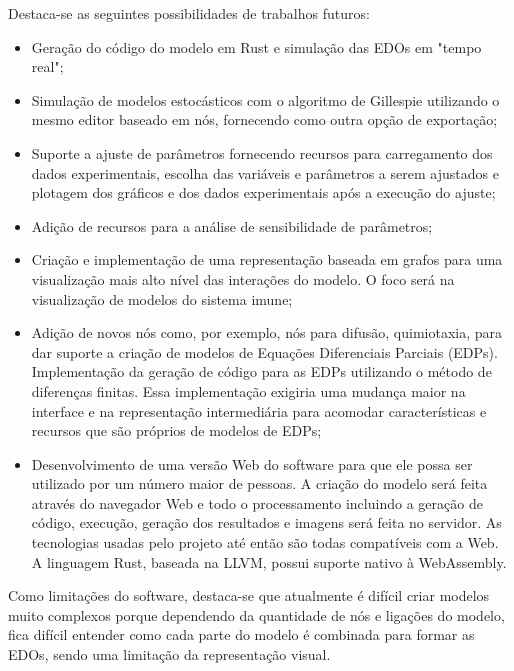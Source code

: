 \documentclass[
	12pt,				%
	openright,			%
	oneside,			%
	a4paper,			%
	main=brazil,
	english,			%
	]{ufsj-abntex2}
\begin{document}
Destaca-se as seguintes possibilidades de trabalhos futuros: 
\begin{itemize}
    \item Geração do código do modelo em Rust e simulação das EDOs em "tempo real";
    \item Simulação de modelos estocásticos com o algoritmo de Gillespie utilizando o mesmo editor baseado em nós, fornecendo como outra opção de exportação; 
    \item Suporte a ajuste de parâmetros fornecendo recursos para carregamento dos dados experimentais, escolha das variáveis e parâmetros a serem ajustados e plotagem dos gráficos e dos dados experimentais após a execução do ajuste; 
    \item Adição de recursos para a análise de sensibilidade de parâmetros;
    \item Criação e implementação de uma representação baseada em grafos para uma visualização mais alto nível das interações do modelo. O foco será na visualização de modelos do sistema imune; 
    \item Adição de novos nós como, por exemplo, nós para difusão, quimiotaxia, para dar suporte a criação de modelos de Equações Diferenciais Parciais (EDPs). Implementação da geração de código para as EDPs utilizando o método de diferenças finitas. Essa implementação exigiria uma mudança maior na interface e na representação intermediária para acomodar características e recursos que são próprios de modelos de EDPs; 
    \item Desenvolvimento de uma versão Web do software para que ele possa ser utilizado por um número maior de pessoas. A criação do modelo será feita através do navegador Web e todo o processamento incluindo a geração de código, execução, geração dos resultados e imagens será feita no servidor. As tecnologias usadas pelo projeto até então são todas compatíveis com a Web. A linguagem Rust, baseada na LLVM, possui suporte nativo à WebAssembly.
\end{itemize}

Como limitações do software, destaca-se que atualmente é difícil criar modelos muito complexos porque dependendo da quantidade de nós e ligações do modelo, fica difícil entender como cada parte do modelo é combinada para formar as EDOs, sendo uma limitação da representação visual.  

\end{document}
